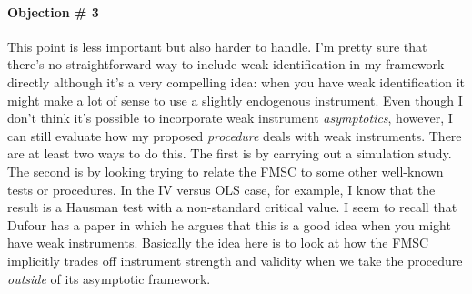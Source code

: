 \documentclass[12pt]{article}
\theoremstyle{definition}
\begin{document}
\paragraph{Objection \# 3} This point is less important but also harder to handle. I'm pretty sure that there's no straightforward way to include weak identification in my framework directly although it's a very compelling idea: when you have weak identification it might make a lot of sense to use a slightly endogenous instrument. Even though I don't think it's possible to incorporate weak instrument \emph{asymptotics}, however, I can still evaluate how my proposed \emph{procedure} deals with weak instruments. There are at least two ways to do this. The first is by carrying out a simulation study. The second is by looking trying to relate the FMSC to some other well-known tests or procedures. In the IV versus OLS case, for example, I know that the result is a Hausman test with a non-standard critical value. I seem to recall that Dufour has a paper in which he argues that this is a good idea when you might have weak instruments. Basically the idea here is to look at how the FMSC implicitly trades off instrument strength and validity when we take the procedure \emph{outside} of its asymptotic framework.  
\end{document}
